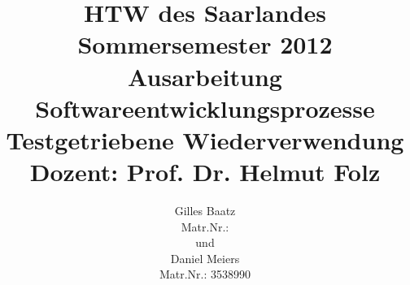 

\title{%
\large HTW des Saarlandes\\
Sommersemester 2012\\
Ausarbeitung Softwareentwicklungsprozesse\\[10mm]
{\LARGE Testgetriebene Wiederverwendung}\\[10mm]
Dozent: Prof. Dr. Helmut Folz}

\author{%
Gilles Baatz\\
Matr.Nr.: \\[5mm]
und\\[5mm]
Daniel Meiers\\
Matr.Nr.: 3538990
}



\maketitle
 
\tableofcontents
\listoffigures











\printbibliography


